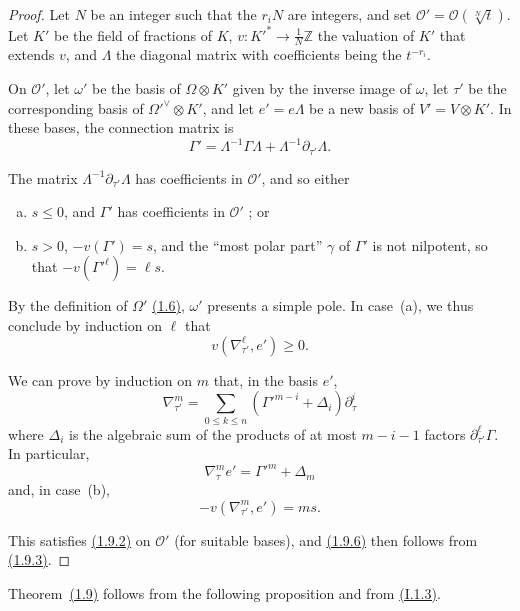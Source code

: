 \documentclass{report}
\renewcommand{\cal}[1]{{\mathcal{#1}}}
\newcommand{\ZZ}{\mathbb{Z}}
\renewcommand{\geq}{\geqslant}
\renewcommand{\leq}{\leqslant}
\newcommand{\oldpage}[1]{\marginpar{\footnotesize$\Big\vert$ \textit{p.~#1}}}
\begin{document}
\begin{proof}
  Let $N$ be an integer such that the $r_iN$ are integers, and set $\cal{O}'=\cal{O}(\sqrt[N]{t})$.
  Let $K'$ be the field of fractions of $K$, $v\colon {K'}^*\to\frac1N\ZZ$ the valuation of $K'$ that extends $v$,
\oldpage{48}
  and $\Lambda$ the diagonal matrix with coefficients being the $t^{-r_i}$.

  On $\cal{O}'$, let $\omega'$ be the basis of $\Omega\otimes K'$ given by the inverse image of $\omega$, let $\tau'$ be the corresponding basis of ${\Omega'}^\vee\otimes K'$, and let $e'=e\Lambda$ be a new basis of $V'=V\otimes K'$.
  In these bases, the connection matrix is
  \[
    \Gamma' = \Lambda^{-1}\Gamma\Lambda + \Lambda^{-1}\partial_{\tau'}\Lambda.
  \]

  The matrix $\Lambda^{-1}\partial_{\tau'}\Lambda$ has coefficients in $\cal{O}'$, and so either
  \begin{enumerate}[(a)]
    \item $s\leq0$, and $\Gamma'$ has coefficients in $\cal{O}'$ ; or
    \item $s>0$, $-v(\Gamma')=s$, and the ``most polar part'' $\gamma$ of $\Gamma'$ is not nilpotent, so that $-v({\Gamma'}^\ell)=\ell s$.
  \end{enumerate}

  By the definition of $\Omega'$ \hyperref[II.1.6]{(1.6)}, $\omega'$ presents a simple pole.
  In case~(a), we thus conclude by induction on $\ell$ that
  \[
    v(\nabla_{\tau'}^\ell,e') \geq 0.
  \]

  We can prove by induction on $m$ that, in the basis $e'$,
  \[
    \nabla_{\tau'}^m = \sum_{0\leq k\leq n}({\Gamma'}^{m-i}+\Delta_i)\partial_\tau^i
  \]
  where $\Delta_i$ is the algebraic sum of the products of at most $m-i-1$ factors $\partial_{\tau'}^\ell\Gamma$.
  In particular,
  \[
    \nabla_\tau^m e' = {\Gamma'}^m+\Delta_m
  \]
  and, in case~(b),
  \[
    -v(\nabla_{\tau'}^m,e') = ms.
  \]

  This satisfies \hyperref[II.1.9.2]{(1.9.2)} on $\cal{O}'$ (for suitable bases), and \hyperref[II.1.9.6]{(1.9.6)} then follows from \hyperref[II.1.9.3]{(1.9.3)}.
\end{proof}

Theorem~\hyperref[II.1.9]{(1.9)} follows from the following proposition and from \hyperref[I.1.3]{(I.1.3)}.
\end{document}

